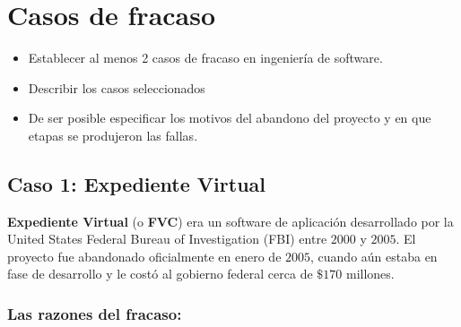 \documentclass[titlepage,a4paper,twoside]{article}
\theoremstyle{definition}
\numberwithin{algorithm}{section}
\theoremstyle{remark}
\numberwithin{equation}{section}
\begin{document}
    \section{Casos de fracaso}
    
    \begin{itemize}
    	\item Establecer al menos 2 casos de fracaso en ingeniería de software.
    	\item Describir los casos seleccionados
    	\item De ser posible especificar los motivos del abandono del proyecto y en que etapas se produjeron
    	las fallas.
    \end{itemize}
    
    \subsection{Caso 1: Expediente Virtual}
    
    
    \textbf{Expediente Virtual} (o \textbf{FVC}) era un software de aplicación desarrollado por la United States Federal Bureau of Investigation (FBI) entre $2000$ y $2005$. El proyecto fue abandonado oficialmente en enero de $2005$, cuando aún estaba en fase de desarrollo y le costó al gobierno federal cerca de $\$170$ millones.
    
    
    \subsubsection{Las razones del fracaso:}
    
    
\end{document}

